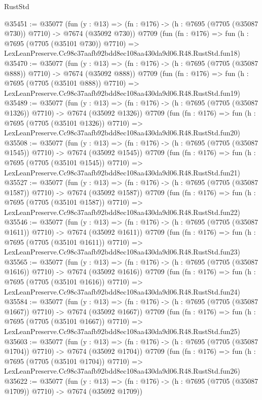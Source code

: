\begin{lexlean}{RustStd}
\begin{coremodule}
@35451 := @35077
    (fun (y : @13) => (fn : @176) -> (h : @7695 (@7705 (@35087 @730)) @7710) -> @7674 (@35092 @730))
    @7709
    (fun (fn : @176) =>
    fun (h : @7695 (@7705 (@35101 @730)) @7710) =>
    LexLeanPreserve.Cc98c37aafb92bdd8ec108aa430da9d06.R48.RustStd.fun18)
@35470 := @35077
    (fun (y : @13) => (fn : @176) -> (h : @7695 (@7705 (@35087 @888)) @7710) -> @7674 (@35092 @888))
    @7709
    (fun (fn : @176) =>
    fun (h : @7695 (@7705 (@35101 @888)) @7710) =>
    LexLeanPreserve.Cc98c37aafb92bdd8ec108aa430da9d06.R48.RustStd.fun19)
@35489 := @35077
    (fun (y : @13) =>
    (fn : @176) -> (h : @7695 (@7705 (@35087 @1326)) @7710) -> @7674 (@35092 @1326))
    @7709
    (fun (fn : @176) =>
    fun (h : @7695 (@7705 (@35101 @1326)) @7710) =>
    LexLeanPreserve.Cc98c37aafb92bdd8ec108aa430da9d06.R48.RustStd.fun20)
@35508 := @35077
    (fun (y : @13) =>
    (fn : @176) -> (h : @7695 (@7705 (@35087 @1545)) @7710) -> @7674 (@35092 @1545))
    @7709
    (fun (fn : @176) =>
    fun (h : @7695 (@7705 (@35101 @1545)) @7710) =>
    LexLeanPreserve.Cc98c37aafb92bdd8ec108aa430da9d06.R48.RustStd.fun21)
@35527 := @35077
    (fun (y : @13) =>
    (fn : @176) -> (h : @7695 (@7705 (@35087 @1587)) @7710) -> @7674 (@35092 @1587))
    @7709
    (fun (fn : @176) =>
    fun (h : @7695 (@7705 (@35101 @1587)) @7710) =>
    LexLeanPreserve.Cc98c37aafb92bdd8ec108aa430da9d06.R48.RustStd.fun22)
@35546 := @35077
    (fun (y : @13) =>
    (fn : @176) -> (h : @7695 (@7705 (@35087 @1611)) @7710) -> @7674 (@35092 @1611))
    @7709
    (fun (fn : @176) =>
    fun (h : @7695 (@7705 (@35101 @1611)) @7710) =>
    LexLeanPreserve.Cc98c37aafb92bdd8ec108aa430da9d06.R48.RustStd.fun23)
@35565 := @35077
    (fun (y : @13) =>
    (fn : @176) -> (h : @7695 (@7705 (@35087 @1616)) @7710) -> @7674 (@35092 @1616))
    @7709
    (fun (fn : @176) =>
    fun (h : @7695 (@7705 (@35101 @1616)) @7710) =>
    LexLeanPreserve.Cc98c37aafb92bdd8ec108aa430da9d06.R48.RustStd.fun24)
@35584 := @35077
    (fun (y : @13) =>
    (fn : @176) -> (h : @7695 (@7705 (@35087 @1667)) @7710) -> @7674 (@35092 @1667))
    @7709
    (fun (fn : @176) =>
    fun (h : @7695 (@7705 (@35101 @1667)) @7710) =>
    LexLeanPreserve.Cc98c37aafb92bdd8ec108aa430da9d06.R48.RustStd.fun25)
@35603 := @35077
    (fun (y : @13) =>
    (fn : @176) -> (h : @7695 (@7705 (@35087 @1704)) @7710) -> @7674 (@35092 @1704))
    @7709
    (fun (fn : @176) =>
    fun (h : @7695 (@7705 (@35101 @1704)) @7710) =>
    LexLeanPreserve.Cc98c37aafb92bdd8ec108aa430da9d06.R48.RustStd.fun26)
@35622 := @35077
    (fun (y : @13) =>
    (fn : @176) -> (h : @7695 (@7705 (@35087 @1709)) @7710) -> @7674 (@35092 @1709))

\end{coremodule}
\end{lexlean}
